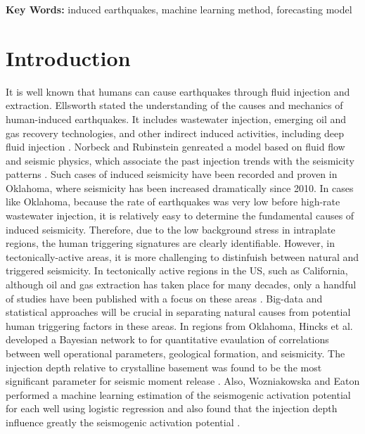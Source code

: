 \documentclass[final-report]{report-template}
\begin{document}
\textbf{Key Words:} induced earthquakes, machine learning method, forecasting model
\newpage

\section{Introduction}
It is well known that humans can cause earthquakes through fluid injection and extraction. Ellsworth stated the understanding of the causes and mechanics of human-induced earthquakes. It includes wastewater injection, emerging oil and gas recovery technologies, and other indirect induced activities,
including deep fluid injection \citep{ellsworth2013injection}.
Norbeck and Rubinstein genreated a model based on fluid flow and seismic physics, which associate the past injection trends with the seismicity patterns \citep{norbeck2018hydromechanical}.
Such cases of induced seismicity have been recorded and proven in Oklahoma, where seismicity has been increased dramatically since 2010.
In cases like Oklahoma, because the rate of earthquakes was very low before high-rate wastewater injection, it is relatively easy to determine the fundamental causes of induced seismicity.
Therefore, due to the low background stress in intraplate regions, the human triggering signatures are clearly identifiable.
However, in tectonically-active areas, it is more challenging to distinfuish between natural and triggered seismicity.
In tectonically active regions in the US, such as California, although oil and gas extraction has taken place for many decades, only a handful of studies have been published with a focus on these areas \citep{Hough2017WasTM}. 
Big-data and statistical approaches will be crucial in separating natural causes from potential human triggering factors in these areas.
In regions from Oklahoma, Hincks et al. developed a Bayesian network to for quantitative evaulation of correlations between well operational parameters, geological formation, and seismicity.
The injection depth relative to crystalline basement was found to be the most significant parameter for seismic moment release \citep{hincks2018oklahoma}.
Also, Wozniakowska and Eaton performed a machine learning estimation of the seismogenic activation potential for each well using logistic regression and also found that the injection depth influence greatly the seismogenic activation potential \citep{wozniakowska2020machine}.
\end{document}
